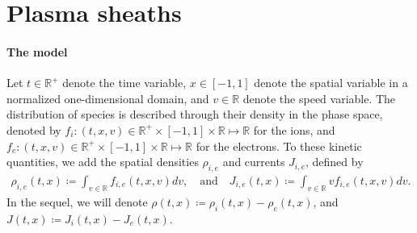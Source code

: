 \documentclass{article}
\numberwithin{equation}{section}
\newcommand{\R}{\mathbb{R}}
\newcommand{\todo}[1]{{\color{red}\textbf{#1}}}
\begin{document}
%

\section{Plasma sheaths}\label{sec:model}

\paragraph{The model}

Let $t\in\mathbb{R}^+$ denote the time variable, $x\in [-1,1]$ denote the spatial variable in a normalized one-dimensional domain, and $v\in\mathbb{R}$ denote the speed variable. The distribution of species is described through their density in the phase space, denoted by $f_i : (t,x,v) \in \R^+ \times [-1,1]\times \R \mapsto \R$ for the ions, and $f_e : (t,x,v) \in \R^+ \times [-1,1]\times \R \mapsto \R$ for the electrons. To these kinetic quantities, we add the spatial densities $\rho_{i,e}$ and currents $J_{i,e}$, defined by
\begin{align}\label{eq:def_ni_ne}
	\rho_{i,e} (t,x) \coloneqq \int_{v\in\R} f_{i,e} (t,x,v) dv, \quad\text{and}\quad J_{i,e} (t,x) \coloneqq \int_{v\in\R} v f_{i,e} (t,x,v) dv. 
\end{align}
In the sequel, we will denote $\rho (t,x) \coloneqq \rho_i (t,x) - \rho_e(t,x)$, and $J(t,x) \coloneqq J_i(t,x) - J_e(t,x)$.
\end{document}
